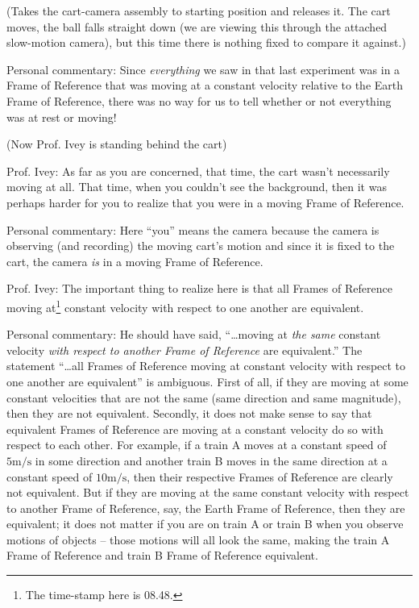 \documentclass[a6paper]{article}
\begin{document}
(Takes the cart-camera assembly to starting position and releases it. The cart moves, the ball falls straight down (we are viewing this through the attached slow-motion camera), but this time there is nothing fixed to compare it against.)

Personal commentary: Since \emph{everything} we saw in that last experiment was in a Frame of Reference that was moving at a constant velocity relative to the Earth Frame of Reference, there was no way for us to tell whether or not everything was at rest or moving!

(Now Prof. Ivey is standing behind the cart)

Prof. Ivey: As far as you are concerned, that time, the cart wasn't necessarily moving at all. That time, when you couldn't see the background, then it was perhaps harder for you to realize that you were in a moving Frame of Reference. 

Personal commentary: Here ``you'' means the camera because the camera is observing (and recording) the moving cart's motion and since it is fixed to the cart, the camera \emph{is} in a moving Frame of Reference.

Prof. Ivey: The important thing to realize here is that all Frames of Reference moving at\footnote{The time-stamp here is 08.48.} constant velocity with respect to one another are equivalent.

Personal commentary: He should have said, ``\dots moving at \emph{the same} constant velocity \emph{with respect to another Frame of Reference} are equivalent.'' The statement ``\dots all Frames of Reference moving at constant velocity with respect to one another are equivalent'' is ambiguous. First of all, if they are moving at some constant velocities that are not the same (same direction and same magnitude), then they are not equivalent. Secondly, it does not make sense to say that equivalent Frames of Reference are moving at a constant velocity do so with respect to each other. For example, if a train A moves at a constant speed of $5\si{\m\per\s}$ in some direction and another train B moves in the same direction at a constant speed of $10\si{\m\per\s}$, then their respective Frames of Reference are clearly not equivalent. But if they are moving at the same constant velocity with respect to another Frame of Reference, say, the Earth Frame of Reference, then they are equivalent; it does not matter if you are on train A or train B when you observe motions of objects -- those motions will all look the same, making the train A Frame of Reference and train B Frame of Reference equivalent.
\end{document}
